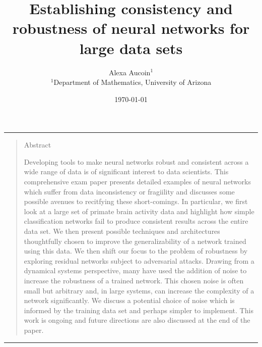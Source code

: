 \documentclass[12pt]{article}
\title{Establishing consistency and robustness of neural networks for large data sets}
\author{Alexa Aucoin$^{1}$ \\ \normalsize{$^{1}$Department of Mathematics, University of Arizona}}
\date{\today}
\newenvironment{sciabstract}{%
\begin{quote} \bf}
{\end{quote}}
\begin{document}
\maketitle

\hrule
\begin{sciabstract}
\begin{center} \large{Abstract}\end{center}
Developing tools to make neural networks robust and consistent across a wide range of data is of significant interest to data scientists. This comprehensive exam paper presents detailed examples of neural networks which suffer from data inconsistency or fragiility and discusses some possible avenues to recitfying these short-comings. In particular, we first look at a large set of primate brain activity data and highlight how simple classification networks fail to produce consistent results across the entire data set. We then present possible techniques and architectures thoughtfully chosen to improve the generalizability of a network trained using this data. We then shift our focus to the problem of robustness by exploring residual networks subject to adversarial attacks. Drawing from a dynamical systems perspective, many have used the addition of noise to increase the robustness of a trained network. This chosen noise is often small but arbitrary and, in large systems, can increase the complexity of a network significantly. We discuss a potential choice of noise which is informed by the training data set and perhaps simpler to implement. This work is ongoing and future directions are also discussed at the end of the paper.
\end{sciabstract}
\hrule
\end{document}
